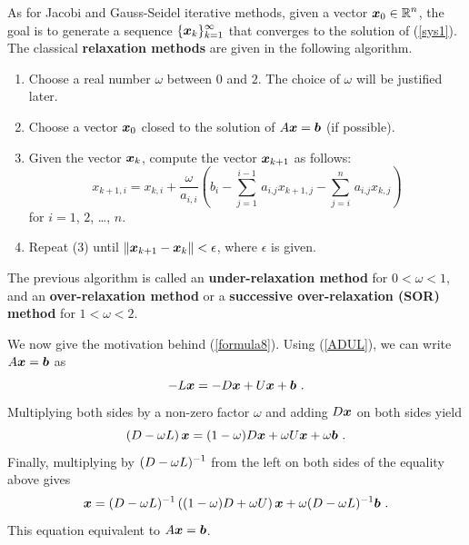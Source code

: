 As for Jacobi and Gauss-Seidel iterative methods, given a vector
$\displaystyle \bm{x}_{0} \in \mathbb{R}^n$, the goal is to generate a sequence
$\displaystyle \{\bm{x}_{k}\}_{k=1}^\infty$ that converges to the
solution of (\ref{sys1}). The classical
{\bfseries relaxation methods} are given in
the following algorithm.

\begin{algo}
\begin{enumerate}
\item Choose a real number $\omega$ between $0$ and $2$.  The choice of
$\omega$ will be justified later.
\item Choose a vector $\bm{x}_{0}$ closed to the solution of
$ A \bm{x} = \bm{b}$ (if possible).
\item Given the vector $\bm{x}_k$, compute the vector
$\bm{x}_{k+1}$ as follows:
\begin{equation} \label{formula8}
x_{k+1,i} = x_{k,i} + \frac{\omega}{a_{i,i}} \left(
b_i -\sum_{j=1}^{i-1}\, a_{i.j} x_{k+1,j}
-\sum_{j=i}^{n}\, a_{i.j} x_{k,j} \right)
\end{equation}
for $i = 1$, $2$, \ldots, $n$. 
\item Repeat (3) until
$\| \bm{x}_{k+1} - \bm{x}_{k} \| < \epsilon$, where $\epsilon$ is
given.
\end{enumerate}
\end{algo}

The previous algorithm is called an
{\bfseries under-relaxation method}
for $0 < \omega < 1$, and an
{\bfseries over-relaxation method} or a
{\bfseries successive over-relaxation (SOR) method} for $1 < \omega <2$.

We now give the motivation behind (\ref{formula8}).  Using
(\ref{ADUL}), we can write
$A\bm{x} = \bm{b}$ as 
\[
-L\VEC{x} = -D\VEC{x} + U\VEC{x} + \VEC{b} \ .
\]
Multiplying both sides by a non-zero factor $\omega$ and adding
$D\bm{x}$ on both sides yield
\[
\left( D - \omega L\right) \bm{x} = (1 - \omega) D\bm{x}
+ \omega U\bm{x} + \omega \bm{b} \ .
\]
Finally, multiplying by $\displaystyle (D-\omega L)^{-1}$ from the left on both
sides of the equality above gives
\begin{equation}\label{rmlongform}
\bm{x} = (D-\omega L)^{-1} \left( (1-\omega)D + \omega U\right)
\bm{x} + \omega(D-\omega L)^{-1}\bm{b} \ .
\end{equation}
This equation equivalent to $A\bm{x} = \bm{b}$.

